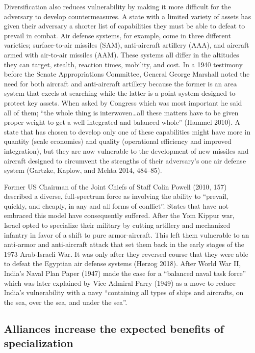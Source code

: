 \documentclass[
  12,
  letterpaper,
  DIV=11,
  numbers=noendperiod]{scrartcl}
\begin{document}
Diversification also reduces vulnerability by making it more difficult
for the adversary to develop countermeasures. A state with a limited
variety of assets has given their adversary a shorter list of
capabilities they must be able to defeat to prevail in combat. Air
defense systems, for example, come in three different varieties;
surface-to-air missiles (SAM), anti-aircraft artillery (AAA), and
aircraft armed with air-to-air missiles (AAM). These systems all differ
in the altitudes they can target, stealth, reaction times, mobility, and
cost. In a 1940 testimony before the Senate Appropriations Committee,
General George Marshall noted the need for both aircraft and
anti-aircraft artillery because the former is an area system that excels
at searching while the latter is a point system designed to protect key
assets. When asked by Congress which was most important he said all of
them; ``the whole thing is interwoven\ldots all these matters have to be
given proper weight to get a well integrated and balanced whole''
(Hammel 2010). A state that has chosen to develop only one of these
capabilities might have more in quantity (scale economies) and quality
(operational efficiency and improved integration), but they are now
vulnerable to the development of new missiles and aircraft designed to
circumvent the strengths of their adversary's one air defense system
(Gartzke, Kaplow, and Mehta 2014, 484--85).

Former US Chairman of the Joint Chiefs of Staff Colin Powell (2010, 157)
described a diverse, full-spectrum force as involving the ability to
``prevail, quickly, and cheaply, in any and all forms of conflict''.
States that have not embraced this model have consequently suffered.
After the Yom Kippur war, Israel opted to specialize their military by
cutting artillery and mechanized infantry in favor of a shift to pure
armor-aircraft. This left them vulnerable to an anti-armor and
anti-aircraft attack that set them back in the early stages of the 1973
Arab-Israeli War. It was only after they reversed course that they were
able to defeat the Egyptian air defense systems (Herzog 2018). After
World War II, India's Naval Plan Paper (1947) made the case for a
``balanced naval task force'' which was later explained by Vice Admiral
Parry (1949) as a move to reduce India's vulnerability with a navy
``containing all types of ships and aircrafts, on the sea, over the sea,
and under the sea''.

\hypertarget{alliances-increase-the-expected-benefits-of-specialization}{%
\subsection{Alliances increase the expected benefits of
specialization}\label{alliances-increase-the-expected-benefits-of-specialization}}
\end{document}
